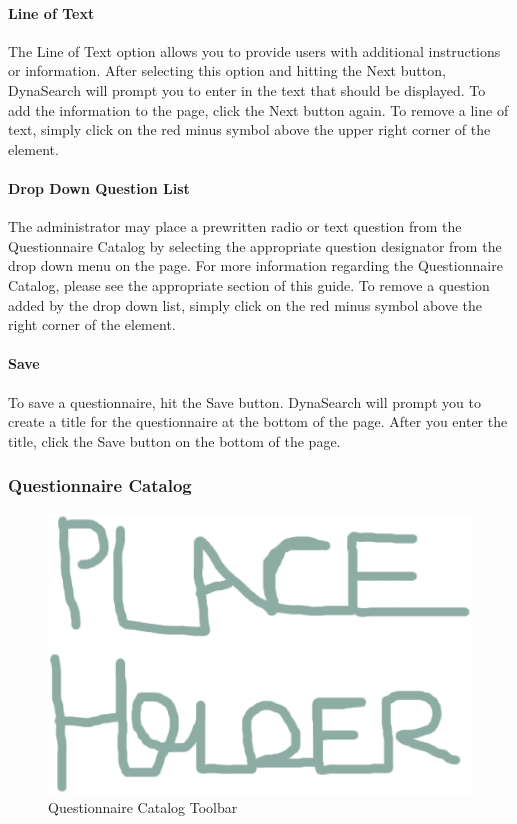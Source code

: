 \documentclass[article]{ij4uq}              %
\begin{document}
\paragraph{Line of Text}
The Line of Text option allows you to provide users with additional instructions or information. After selecting this option and hitting the Next button, DynaSearch will prompt you to enter in the text that should be displayed. To add the information to the page, click the Next button again. To remove a line of text, simply click on the red minus symbol above the upper right corner of the element. 

\paragraph{Drop Down Question List}
The administrator may place a prewritten radio or text question from the Questionnaire Catalog by selecting the appropriate question designator from the drop down menu on the page. For more information regarding the Questionnaire Catalog, please see the appropriate section of this guide. To remove a question added by the drop down list, simply click on the red minus symbol above the right corner of the element. 

\paragraph{Save}
To save a questionnaire, hit the Save button. DynaSearch will prompt you to create a title for the questionnaire at the bottom of the page. After you enter the title, click the Save button on the bottom of the page.

\subsubsection{Questionnaire Catalog}

\begin{figure}[h!]
 \centering
 \includegraphics[width=5.0in]{figures/place.eps}
 \caption{Questionnaire Catalog Toolbar}
 \label{fig:questCatTool}
\end{figure}
\FloatBarrier
\end{document}
